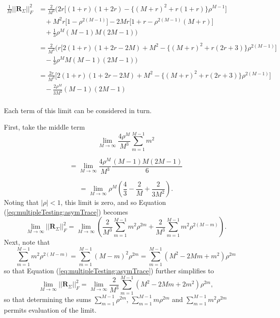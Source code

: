 \documentclass[letterpaper,12pt,oneside,final]{article}
\newcommand{\m}[1]{\mathbf{#1}}               %
\newcommand{\norm}[1]{||{#1}||}              %
\newcommand{\frob}[1]{\norm{#1}_F}
\newcommand{\abs}[1]{\lvert{#1}\rvert}              %
\begin{document}
\begin{equation} \label{eq:multipleTesting:traceSimplified}
  \begin{aligned}
    \frac{1}{M} \frob{\m{R}_{\Sigma}}^2 & = \frac{2}{M^3} \bigg ( 2r  \Big [ (1 + r)(1 + 2r) - \{ (M + r)^2 + r(1 + r) \} \rho^{M-1} \Big ] \\
    & ~~~~ + M^2 r \Big [ 1 - \rho^{2(M-1)} \Big ] - 2Mr\Big [ 1 + r - \rho^{2(M-1)} ( M + r ) \Big ]  \\
    & ~~~~ + \frac{1}{3}\rho^M (M-1)M(2M-1) \bigg ) \\
    & \\
    & = \frac{2}{M^3} \bigg ( r \Big [ 2(1 + r)(1 + 2r - 2M) + M^2 - \big \{ (M+r)^2 + r(2r+3) \big \} \rho^{2(M-1)} \Big ] \\
    & ~~~~ - \frac{1}{3} \rho^M M(M-1)(2M-1) \bigg ) \\
    & \\
    & = \frac{2r}{M^3} \Big [ 2(1 + r)(1 + 2r - 2M) + M^2 - \big \{ (M+r)^2 + r(2r+3) \big \} \rho^{2(M-1)} \Big ] \\
    & ~~~~ - \frac{2 \rho^M}{3 M^2} (M-1)(2M-1) \\
  \end{aligned}
\end{equation}



Each term of this limit can be considered in turn.

First, take the middle term
$$\lim_{M \rightarrow \infty} \frac{4\rho^M}{M^3}\sum_{m = 1}^{M-1} m^2$$

$$=\lim_{M \rightarrow \infty} \frac{4\rho^M}{M^3} \frac{(M-1)M(2M-1)}{6}$$

$$=\lim_{M \rightarrow \infty} \rho^M \left ( \frac{4}{3} - \frac{2}{M} + \frac{2}{3M^2} \right ).$$
Noting that $\abs{\rho} < 1$, this limit is zero, and so Equation (\ref{eq:multipleTesting:asymTrace}) becomes
\begin{equation*}
    \lim_{M \rightarrow \infty} \frob{\m{R}_{\Sigma}}^2  = \lim_{M \rightarrow \infty} \left ( \frac{2}{M^3} \sum_{m = 1}^{M-1} m^2 \rho^{2m} + \frac{2}{M^3} \sum_{m = 1}^{M-1} m^2 \rho^{2(M-m)} \right ).
\end{equation*}
Next, note that
$$\sum_{m = 1}^{M-1} m^2 \rho^{2(M-m)} = \sum_{m = 1}^{M-1} (M - m)^2 \rho^{2m} = \sum_{m = 1}^{M-1} (M^2 - 2Mm + m^2) \rho^{2m}$$
so that Equation (\ref{eq:multipleTesting:asymTrace}) further simplifies to
\begin{equation} \label{eq:multipleTesting:traceSimpd}
    \lim_{M \rightarrow \infty} \frob{\m{R}_{\Sigma}}^2  = \lim_{M \rightarrow \infty} \frac{2}{M^3} \sum_{m = 1}^{M-1} (M^2 - 2Mm + 2m^2) \rho^{2m},
\end{equation}
so that determining the sums $\sum_{m = 1}^{M-1} \rho^{2m}$, $\sum_{m = 1}^{M-1} m \rho^{2m}$ and $\sum_{m=1}^{M-1} m^2 \rho^{2m}$ permits evaluation of the limit.
\end{document}
